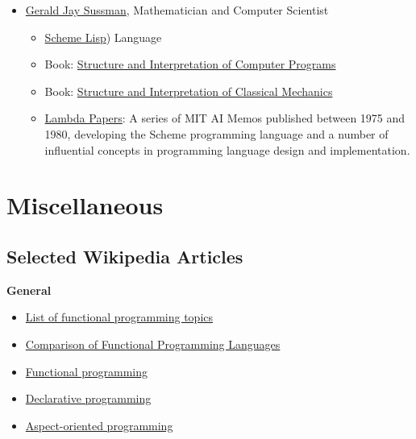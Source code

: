 \documentclass[11pt]{article}
\begin{document}
\begin{itemize}
\item \href{https://en.wikipedia.org/wiki/Gerald_Jay_Sussman}{Gerald Jay Sussman}, Mathematician and Computer Scientist

\begin{itemize}
\item \href{https://en.wikipedia.org/wiki/Scheme_(programming_language}{Scheme Lisp}) Language
\item Book: \href{https://en.wikipedia.org/wiki/Structure_and_Interpretation_of_Computer_Programs}{Structure and Interpretation of Computer Programs}
\item Book: \href{https://en.wikipedia.org/wiki/Structure_and_Interpretation_of_Classical_Mechanics}{Structure and Interpretation of Classical Mechanics}

\item \href{https://en.wikipedia.org/wiki/History_of_the_Scheme_programming_language#The_Lambda_Papers}{Lambda Papers}: A series of MIT AI Memos published between 1975
and 1980, developing the Scheme programming language and a number
of influential concepts in programming language design and
implementation.
\end{itemize}
\end{itemize}

\section{Miscellaneous}
\label{sec-4}
\subsection{Selected Wikipedia Articles}
\label{sec-4-1}

\textbf{General}

\begin{itemize}
\item \href{http://en.wikipedia.org/wiki/List_of_functional_programming_topics}{List of functional programming topics}

\item \href{http://en.wikipedia.org/wiki/Comparison_of_functional_programming_languages}{Comparison of Functional Programming Languages}
\item \href{http://en.wikipedia.org/wiki/Functional_programming}{Functional programming}

\item \href{http://en.wikipedia.org/wiki/Declarative_programming}{Declarative programming}
\item \href{http://en.wikipedia.org/wiki/Aspect-oriented_programming}{Aspect-oriented programming}
\end{itemize}
\end{document}
